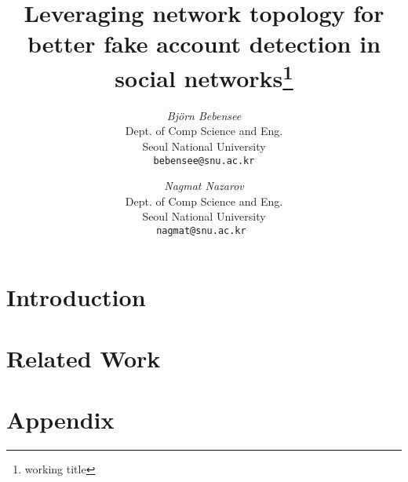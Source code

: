 \documentclass[12pt]{article}
\begin{document}
\newcommand{\beq}{\begin{equation}}
\newcommand{\eeq}{\end{equation}}
\newcommand{\bit}{\begin{itemize*}}
\newcommand{\eit}{\end{itemize*}}
\newcommand{\goal}[1]{ {\noindent {$\Rightarrow$} \em {#1} } }
\newcommand{\hide}[1]{}
\newcommand{\comment}[1]{ {\footnotesize {#1} } }
\newtheorem{lemma}{Lemma}
\newtheorem{theorem}{Theorem}
\newtheorem{proof}{Proof}
\newtheorem{defn}{Definition}
\newtheorem{algo}{Algorithm}
\newtheorem{observation}{Observation}

\title{Leveraging network topology for better fake account detection in social networks\footnote{working title}}


\author{ {\em Björn Bebensee} \\
	    Dept. of Comp Science and Eng.\\
	    Seoul National University\\
	    {\tt bebensee@snu.ac.kr}
	 \and
	 {\em Nagmat Nazarov} \\
	     Dept. of Comp Science and Eng.\\
	     Seoul National University \\
	     {\tt nagmat@snu.ac.kr }
        }


\maketitle
\begin{abstract}
    
\end{abstract}

\section{Introduction}
    \label{sec:intro}
    

\section{Related Work}
    \label{sec:survey}
    

%    

%    


%    





\newpage
\appendix
\section{Appendix}


\newpage
{}
\tableofcontents
\end{document}
